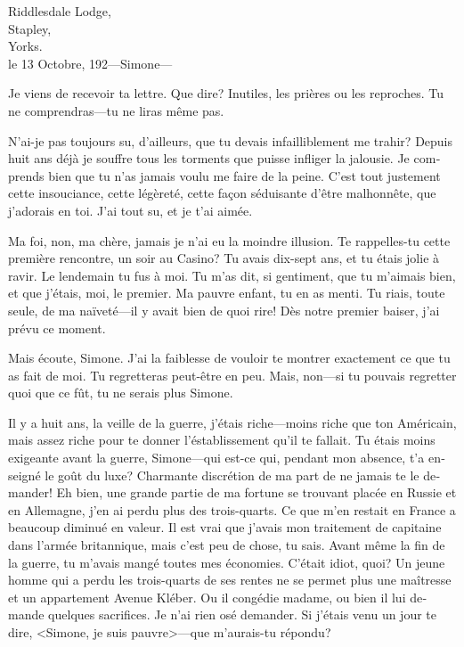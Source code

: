 \begin{french}
	\begin{letter}
		\vspace{-1em}
	\end{letter}

	\begin{mail}{Riddlesdale Lodge,\\Stapley,\\ Yorks.\\le 13 Octobre, 192—}{Simone---}
	
	Je viens de recevoir ta lettre. Que dire? Inutiles, les prières ou les reproches. Tu ne comprendras—tu ne liras même pas.

N'ai-je pas toujours su, d'ailleurs, que tu devais infailliblement me trahir? Depuis huit ans déjà je souffre tous les torments que puisse infliger la jalousie. Je comprends bien que tu n'as jamais voulu me faire de la peine. C'est tout justement cette insouciance, cette légèreté, cette façon séduisante d'être malhonnête, que j'adorais en toi. J'ai tout su, et je t'ai aimée.

Ma foi, non, ma chère, jamais je n'ai eu la moindre illusion. Te rappelles-tu cette première rencontre, un soir au Casino? Tu avais dix-sept ans, et tu étais jolie à ravir. Le lendemain tu fus à moi. Tu m'as dit, si gentiment, que tu m'aimais bien, et que j'étais, moi, le premier. Ma pauvre enfant, tu en as menti. Tu riais, toute seule, de ma naïveté—il y avait bien de quoi rire! Dès notre premier baiser, j'ai prévu ce moment.

Mais écoute, Simone. J'ai la faiblesse de vouloir te montrer exactement ce que tu as fait de moi. Tu regretteras peut-être en peu. Mais, non—si tu pouvais regretter quoi que ce fût, tu ne serais plus Simone.

Il y a huit ans, la veille de la guerre, j'étais riche—moins riche que ton Américain, mais assez riche pour te donner l'éstablissement qu'il te fallait. Tu étais moins exigeante avant la guerre, Simone—qui est-ce qui, pendant mon absence, t'a enseigné le goût du luxe? Charmante discrétion de ma part de ne jamais te le demander! Eh bien, une grande partie de ma fortune se trouvant placée en Russie et en Allemagne, j'en ai perdu plus des trois-quarts. Ce que m'en restait en France a beaucoup diminué en valeur. Il est vrai que j'avais mon traitement de capitaine dans l'armée britannique, mais c'est peu de chose, tu sais. Avant même la fin de la guerre, tu m'avais mangé toutes mes économies. C'était idiot, quoi? Un jeune homme qui a perdu les trois-quarts de ses rentes ne se permet plus une maîtresse et un appartement Avenue Kléber. Ou il congédie madame, ou bien il lui demande quelques sacrifices. Je n'ai rien osé demander. Si j'étais venu un jour te dire, <Simone, je suis pauvre>—que m'aurais-tu répondu?


\end{mail}
\end{french}
